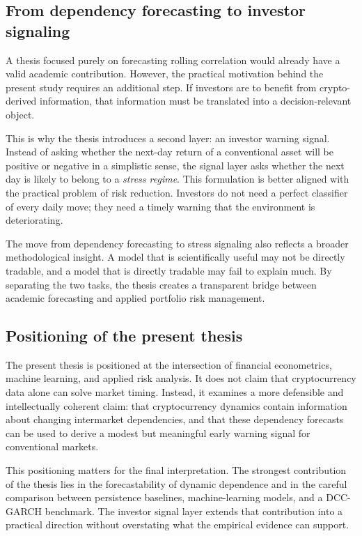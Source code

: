 \subsection{From dependency forecasting to investor signaling}

A thesis focused purely on forecasting rolling correlation would already have a valid academic contribution. However, the practical motivation behind the present study requires an additional step. If investors are to benefit from crypto-derived information, that information must be translated into a decision-relevant object.

This is why the thesis introduces a second layer: an investor warning signal. Instead of asking whether the next-day return of a conventional asset will be positive or negative in a simplistic sense, the signal layer asks whether the next day is likely to belong to a \emph{stress regime}. This formulation is better aligned with the practical problem of risk reduction. Investors do not need a perfect classifier of every daily move; they need a timely warning that the environment is deteriorating.

The move from dependency forecasting to stress signaling also reflects a broader methodological insight. A model that is scientifically useful may not be directly tradable, and a model that is directly tradable may fail to explain much. By separating the two tasks, the thesis creates a transparent bridge between academic forecasting and applied portfolio risk management.

\subsection{Positioning of the present thesis}

The present thesis is positioned at the intersection of financial econometrics, machine learning, and applied risk analysis. It does not claim that cryptocurrency data alone can solve market timing. Instead, it examines a more defensible and intellectually coherent claim: that cryptocurrency dynamics contain information about changing intermarket dependencies, and that these dependency forecasts can be used to derive a modest but meaningful early warning signal for conventional markets.

This positioning matters for the final interpretation. The strongest contribution of the thesis lies in the forecastability of dynamic dependence and in the careful comparison between persistence baselines, machine-learning models, and a DCC-GARCH benchmark. The investor signal layer extends that contribution into a practical direction without overstating what the empirical evidence can support.
